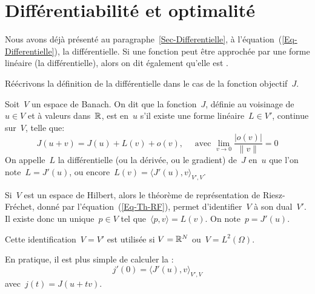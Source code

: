 \medskip
\section{Différentiabilité et optimalité}

Nous avons déjà présenté au paragraphe~\ref{Sec-Differentielle}, à l'équation~(\ref{Eq-Differentielle}), la différentielle. Si une fonction peut être approchée par une forme linéaire (la différentielle), alors on dit également qu'elle est .

Réécrivons la définition de la différentielle dans le cas de la fonction objectif~$J$.
\begin{definition}
Soit~$V$ un espace de Banach. On dit que la fonction~$J$, définie au voisinage de~$u\in V$ et à valeurs dans~$\mathbb R$, est  en~$u$ s'il existe une forme linéaire~$L\in V'$, continue sur~$V$, telle que:
\begin{equation}
J(u+v) = J(u) + L(v) + o(v), \quad \text{ avec } \lim_{v\rightarrow0} \dfrac{|o(v)|}{\|v\|}=0
\end{equation}
On appelle~$L$ la différentielle (ou la dérivée, ou le gradient) de~$J$ en~$u$ que l'on note~$L=J'(u)$, ou encore~$L(v)=\langle J'(u),v\rangle_{V',V}$.
\end{definition}
\begin{remarque}[Remarques]
Si~$V$ est un espace de Hilbert, alors le théorème de représentation de Riesz-Fréchet, donné par l'équation~(\ref{Eq-Th-RF}), permet d'identifier~$V$ à son dual~$V'$. Il existe donc un unique~$p\in V$ tel que~$\langle p,v\rangle = L(v)$. On note~$p=J'(u)$.
\par\noindent
Cette identification~$V=V'$ est utilisée si $V=\mathbb R^N$ ou~$V=L^2(\Omega)$.
\par\noindent{}
En pratique, il est plus simple de calculer la :
\begin{equation}
j'(0) = \langle J'(u),v\rangle_{V',V}
\end{equation}
avec~$j(t)=J(u+tv)$.
\end{remarque}

